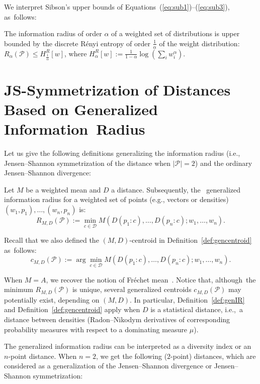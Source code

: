 \documentclass[entropy,article,accept,oneauthor,pdftex,entropy]{Definitions/mdpi}
\def\calD{\mathcal{D}}
\def\calP{\mathcal{P}}
\begin{document}
\begin{paracol}{2}
 

We interpret Sibson's upper bounds of Equations~(\ref{eq:sub1})--(\ref{eq:sub3}), as~follows:

\begin{Proposition}\label{prop:IRUB}
The information radius of order $\alpha$ of a weighted set of distributions is upper bounded by the discrete R\'enyi entropy of order $\frac{1}{\alpha}$ of the weight distribution: $R_\alpha(\calP)\leq H_{\frac{1}{\alpha}}^R[w]$, where $H_\alpha^R[w] := \frac{1}{1-\alpha}\log\left( \sum_i w_i^\alpha \right)$.
\end{Proposition}


\section{JS-Symmetrization of Distances Based on Generalized Information~Radius}\label{sec:irgen}

Let us give the following definitions generalizing the information radius (i.e., Jensen--Shannon symmetrization of the distance when $|\calP|=2$) and the ordinary Jensen--Shannon divergence:

\begin{Definition}\label{def:genIR}
Let $M$ be a weighted mean and $D$ a  distance. 
Subsequently, the~ generalized information radius for a weighted set of points (e.g., vectors or densities) $(w_1,p_1),\ldots, (w_n,p_n)$ is:
$$
R_{M,D}(\calP) := \min_{c\in\calD} M\left(D(p_1:c),\ldots, D(p_n:c); w_1,\ldots, w_n\right).
$$
\end{Definition}

Recall that we also defined the $(M,D)$-centroid in Definition~\ref{def:gencentroid} as~follows:
$$
c_{M,D}(\calP) := \arg\min_{c\in\calD} M\left(D(p_1:c),\ldots, D(p_n:c); w_1,\ldots, w_n\right).
$$
 
When $M=A$, we recover the notion of Fr\'echet mean~\cite{Frechet-1948}.
Notice that, although~the minimum $R_{M,D}(\calP)$ is unique, several generalized centroids $c_{M,D}(\calP)$ may potentially exist, depending on 
$(M,D)$.
In particular,  Definition~\ref{def:genIR} and Definition~\ref{def:gencentroid} apply when $D$ is a statistical distance, i.e.,~a distance between densities (Radon--Nikodym derivatives of corresponding probability measures with respect to a dominating measure $\mu$).

The generalized information radius can be interpreted as a diversity index or an $n$-point distance.
When $n=2$, we get the following ($2$-point) distances, which are considered as a generalization of the Jensen--Shannon divergence 
or Jensen--Shannon symmetrization:




\end{paracol}
\end{document}

